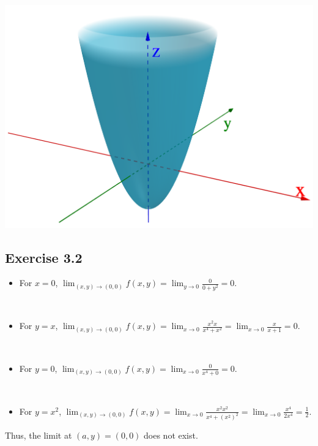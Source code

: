 \begin{enumerate}
\begin{minipage}[t]{0.45\linewidth}
        \begin{center} \includegraphics[width=\linewidth]{Plots/e_1_7/2.png} \end{center}
    \end{minipage}
\end{enumerate}

\subsection*{Exercise 3.2}

\begin{itemize}
        \item For $x = 0$, $\lim_{(x,y)\to(0,0)}f(x,y) = \lim_{y\to0}\frac{0}{0 + y^2} = 0$. 

        {~~~}

        \item For $y = x$, $\lim_{(x,y)\to(0,0)}f(x,y) = \lim_{x\to0} \frac{x^2x}{x^4 + x^2} = \lim_{x\to0} \frac{x}{x+1} = 0$. 

        {~~~}

        \item For $y = 0$, $\lim_{(x,y)\to(0,0)}f(x,y) = \lim_{x\to0}\frac{0}{x^4 + 0} = 0$. 

        {~~~}

        \item For $y = x^2$, $\lim_{(x,y)\to(0,0)}f(x,y) = \lim_{x\to0} \frac{x^2x^2}{x^4 + (x^2)^2} = \lim_{x\to0} \frac{x^4}{2x^4} = \frac{1}{2}$. 
\end{itemize} 

Thus, the limit at $(a,y) = (0,0)$ does not exist. 

